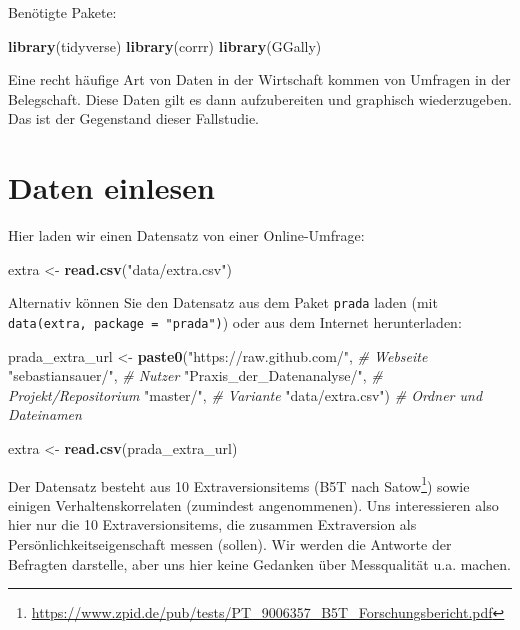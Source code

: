 \documentclass[12pt,ngerman,]{book}
\makeatletter
\newenvironment{Shaded}{\begin{snugshade}}{\end{snugshade}}
\newcommand{\KeywordTok}[1]{\textcolor[rgb]{0.13,0.29,0.53}{\textbf{#1}}}
\newcommand{\StringTok}[1]{\textcolor[rgb]{0.31,0.60,0.02}{#1}}
\newcommand{\CommentTok}[1]{\textcolor[rgb]{0.56,0.35,0.01}{\textit{#1}}}
\newcommand{\NormalTok}[1]{#1}
\let\rmarkdownfootnote\footnote%
\def\footnote{\protect\rmarkdownfootnote}
\newenvironment{kframe}{%
\medskip{}
\setlength{\fboxsep}{.8em}
 \def\at@end@of@kframe{}%
 \ifinner\ifhmode%
  \def\at@end@of@kframe{\end{minipage}}%
  \begin{minipage}{\columnwidth}%
 \fi\fi%
 \def\FrameCommand##1{\hskip\@totalleftmargin \hskip-\fboxsep
 \colorbox{shadecolor}{##1}\hskip-\fboxsep
     \hskip-\linewidth \hskip-\@totalleftmargin \hskip\columnwidth}%
 \MakeFramed {\advance\hsize-\width
   \@totalleftmargin\z@ \linewidth\hsize
   \@setminipage}}%
 {\par\unskip\endMakeFramed%
 \at@end@of@kframe}
\renewenvironment{Shaded}{\begin{kframe}}{\end{kframe}}
\theoremstyle{definition}
\theoremstyle{definition}
\theoremstyle{remark}
\makeatother
\begin{document}
Benötigte Pakete:

\begin{Shaded}
\begin{Highlighting}[]
\KeywordTok{library}\NormalTok{(tidyverse)}
\KeywordTok{library}\NormalTok{(corrr)}
\KeywordTok{library}\NormalTok{(GGally)}
\end{Highlighting}
\end{Shaded}

Eine recht häufige Art von Daten in der Wirtschaft kommen von Umfragen
in der Belegschaft. Diese Daten gilt es dann aufzubereiten und graphisch
wiederzugeben. Das ist der Gegenstand dieser Fallstudie.

\section{Daten einlesen}\label{daten-einlesen}

Hier laden wir einen Datensatz von einer Online-Umfrage:

\begin{Shaded}
\begin{Highlighting}[]
\NormalTok{extra <-}\StringTok{ }\KeywordTok{read.csv}\NormalTok{(}\StringTok{"data/extra.csv"}\NormalTok{)}
\end{Highlighting}
\end{Shaded}

Alternativ können Sie den Datensatz aus dem Paket \texttt{prada} laden
(mit \texttt{data(extra,\ package\ =\ "prada")}) oder aus dem Internet
herunterladen:

\begin{Shaded}
\begin{Highlighting}[]
\NormalTok{prada_extra_url <-}
\StringTok{  }\KeywordTok{paste0}\NormalTok{(}\StringTok{"https://raw.github.com/"}\NormalTok{,  }\CommentTok{# Webseite}
         \StringTok{"sebastiansauer/"}\NormalTok{,  }\CommentTok{# Nutzer}
         \StringTok{"Praxis_der_Datenanalyse/"}\NormalTok{,  }\CommentTok{# Projekt/Repositorium}
         \StringTok{"master/"}\NormalTok{,  }\CommentTok{# Variante}
         \StringTok{"data/extra.csv"}\NormalTok{)  }\CommentTok{# Ordner und Dateinamen}

\NormalTok{extra <-}\StringTok{ }\KeywordTok{read.csv}\NormalTok{(prada_extra_url)}
\end{Highlighting}
\end{Shaded}

Der Datensatz besteht aus 10 Extraversionsitems (B5T nach
Satow\footnote{\url{https://www.zpid.de/pub/tests/PT_9006357_B5T_Forschungsbericht.pdf}})
sowie einigen Verhaltenskorrelaten (zumindest angenommenen). Uns
interessieren also hier nur die 10 Extraversionsitems, die zusammen
Extraversion als Persönlichkeitseigenschaft messen (sollen). Wir werden
die Antworte der Befragten darstelle, aber uns hier keine Gedanken über
Messqualität u.a. machen.
\end{document}
